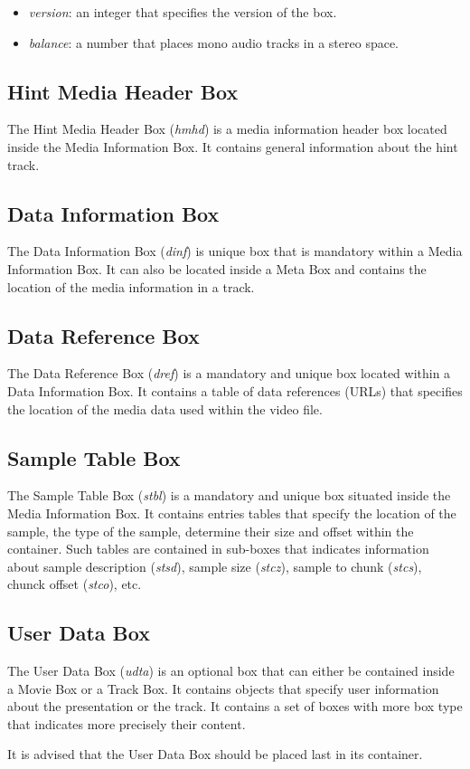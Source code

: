 \begin{itemize}
\item \emph{version}: an integer that specifies the version of the box.
\item \emph{balance}: a number that places mono audio tracks in a stereo space.
\end{itemize}

\subsection*{Hint Media Header Box}

The Hint Media Header Box (\emph{hmhd}) is a media information header box located inside the Media Information Box. It contains general information about the hint track.

\subsection*{Data Information Box}

The Data Information Box (\emph{dinf}) is unique box that is mandatory within a Media Information Box. It can also be located inside a Meta Box and contains the location of the media information in a track.

\subsection*{Data Reference Box}

The Data Reference Box (\emph{dref}) is a mandatory and unique box located within a Data Information Box. It contains a table of data references (URLs) that specifies the location of the media data used within the video file.

\subsection*{Sample Table Box}

The Sample Table Box (\emph{stbl}) is a mandatory and unique box situated inside the Media Information Box. It contains entries tables that specify the location of the sample, the type of the sample, determine their size and offset within the container. Such tables are contained in sub-boxes that indicates information about sample description (\emph{stsd}), sample size (\emph{stcz}), sample to chunk (\emph{stcs}), chunck offset (\emph{stco}), etc.


\subsection*{User Data Box}

The User Data Box (\emph{udta}) is an optional box that can either be contained inside a Movie Box or a Track Box. It contains objects that specify user information about the presentation or the track. It contains a set of boxes with more box type that indicates more precisely their content.

It is advised that the User Data Box should be placed last in its container.